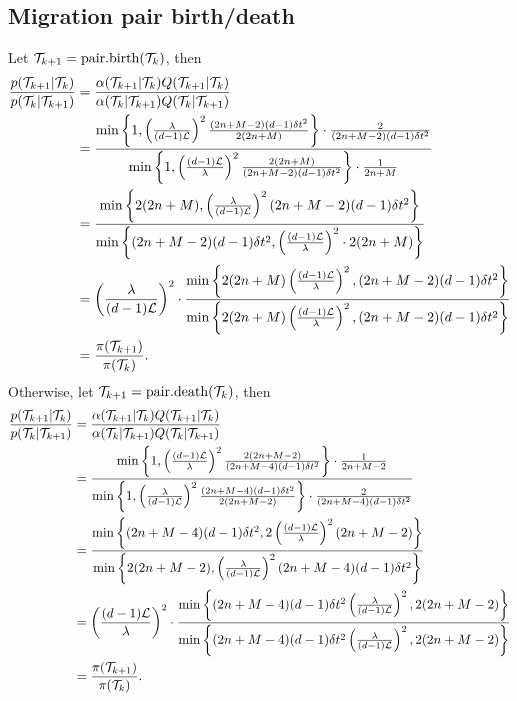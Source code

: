 	\subsection{Migration pair birth/death}
		Let $\mathcal{T}_{k+1} = \text{pair.birth}(\mathcal{T}_k)$, then
			\begin{align*}
				\frac{p(\mathcal{T}_{k+1} | \mathcal{T}_k)}{p(\mathcal{T}_k | \mathcal{T}_{k+1})} & = \frac{\alpha (\mathcal{T}_{k+1} | \mathcal{T}_k) Q(\mathcal{T}_{k+1} | \mathcal{T}_k)}{\alpha(\mathcal{T}_k | \mathcal{T}_{k+1}) Q(\mathcal{T}_k |\mathcal{T}_{k+1})} \\
					& = \frac{\min \left\{ 1, \left( \frac{\lambda}{(d-1) \mathcal{L}} \right)^2 \frac{(2n + M - 2)(d-1) \delta t^2}{2 (2n + M)} \right\} \cdot \frac{2}{(2n + M - 2)(d-1) \delta t^2}}{\min \left\{1, \left( \frac{(d-1) \mathcal{L}}{\lambda}\right)^2 \frac{2(2n + M)}{(2n + M - 2)(d-1) \delta t^2}\right\} \cdot \frac{1}{2n + M}} \\
					& = \frac{\min \left\{ 2(2n + M), \left(\frac{\lambda}{(d-1) \mathcal{L}}\right)^2 (2n + M - 2)(d-1) \delta t^2 \right\}}{\min \left\{ (2n + M - 2)(d-1) \delta t^2, \left( \frac{(d-1) \mathcal{L}}{\lambda} \right)^2 \cdot 2(2n+M) \right\}} \\
					& = \left( \frac{\lambda}{(d-1) \mathcal{L}} \right)^2 \cdot \frac{\min \left\{ 2(2n + M) \left( \frac{(d-1) \mathcal{L}}{\lambda} \right)^2, (2n + M - 2)(d-1) \delta t^2 \right\}}{\min \left\{ 2(2n + M) \left( \frac{(d-1) \mathcal{L}}{\lambda} \right)^2, (2n + M - 2)(d-1) \delta t^2 \right\}} \\
					& = \frac{\pi (\mathcal{T}_{k+1})}{\pi (\mathcal{T}_k)}.
			\end{align*}
		Otherwise, let $\mathcal{T}_{k+1} = \text{pair.death}(\mathcal{T}_k)$, then
			\begin{align*}
				\frac{p(\mathcal{T}_{k+1} | \mathcal{T}_k)}{p(\mathcal{T}_k | \mathcal{T}_{k+1})} & = \frac{\alpha (\mathcal{T}_{k+1} | \mathcal{T}_k) Q(\mathcal{T}_{k+1} | \mathcal{T}_k)}{\alpha(\mathcal{T}_k | \mathcal{T}_{k+1}) Q(\mathcal{T}_k |\mathcal{T}_{k+1})} \\
					& = \frac{\min \left\{ 1, \left( \frac{(d-1) \mathcal{L}}{\lambda} \right)^2 \frac{2 (2n + M - 2)}{(2n + M - 4)(d-1) \delta t^2} \right\} \cdot \frac{1}{2n + M - 2}}{\min \left\{ 1, \left( \frac{\lambda}{(d-1) \mathcal{L}} \right)^2 \frac{(2n + M - 4)(d-1) \delta t^2}{2 (2n + M - 2)} \right\} \cdot \frac{2}{(2n + M - 4)(d-1) \delta t^2}} \\
					& = \frac{\min \left\{ (2n + M - 4)(d-1) \delta t^2, 2 \left( \frac{(d-1) \mathcal{L}}{\lambda} \right)^2 (2n + M - 2) \right\}}{\min \left\{ 2(2n + M - 2), \left( \frac{\lambda}{(d-1) \mathcal{L}} \right)^2 (2n + M - 4)(d-1) \delta t^2 \right\}} \\
					& = \left(\frac{(d-1) \mathcal{L}}{\lambda} \right)^2 \cdot \frac{\min \left\{(2n + M - 4)(d-1) \delta t^2 \left( \frac{\lambda}{(d-1) \mathcal{L}} \right)^2 , 2(2n + M - 2)\right\}}{\min \left\{(2n + M - 4)(d-1) \delta t^2 \left( \frac{\lambda}{(d-1) \mathcal{L}} \right)^2 , 2(2n + M - 2)\right\}} \\
					& = \frac{\pi (\mathcal{T}_{k+1})}{\pi (\mathcal{T}_k)}.
			\end{align*}
		

